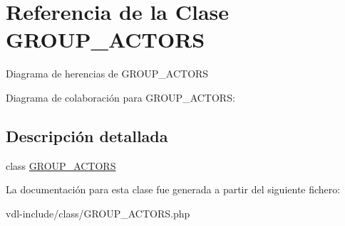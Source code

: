 \hypertarget{class_g_r_o_u_p___a_c_t_o_r_s}{\section{Referencia de la Clase G\-R\-O\-U\-P\-\_\-\-A\-C\-T\-O\-R\-S}
\label{class_g_r_o_u_p___a_c_t_o_r_s}
}


Diagrama de herencias de G\-R\-O\-U\-P\-\_\-\-A\-C\-T\-O\-R\-S


Diagrama de colaboración para G\-R\-O\-U\-P\-\_\-\-A\-C\-T\-O\-R\-S\-:


\subsection{Descripción detallada}
class \hyperlink{class_g_r_o_u_p___a_c_t_o_r_s}{G\-R\-O\-U\-P\-\_\-\-A\-C\-T\-O\-R\-S} 

La documentación para esta clase fue generada a partir del siguiente fichero\-:\begin{DoxyCompactItemize}
\item 
vdl-\/include/class/G\-R\-O\-U\-P\-\_\-\-A\-C\-T\-O\-R\-S.\-php\end{DoxyCompactItemize}
